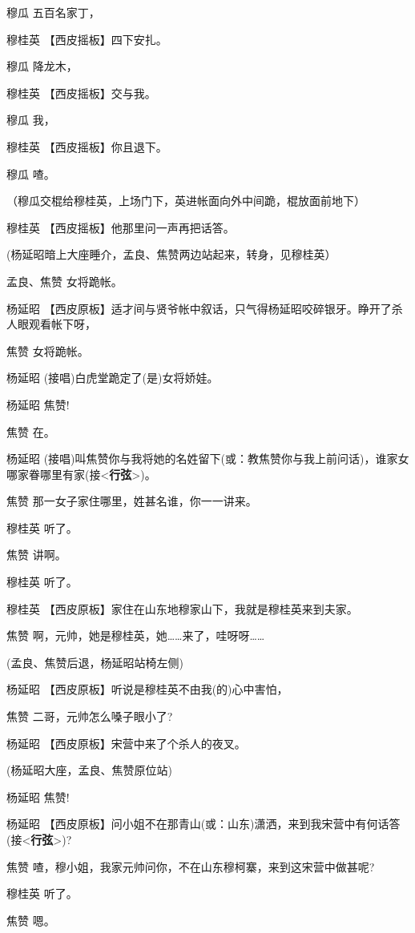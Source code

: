 穆瓜 五百名家丁，

穆桂英 【西皮摇板】四下安扎。

穆瓜 降龙木，

穆桂英 【西皮摇板】交与我。

穆瓜 我，

穆桂英 【西皮摇板】你且退下。

穆瓜 喳。

（穆瓜交棍给穆桂英，上场门下，英进帐面向外中间跪，棍放面前地下）

穆桂英 【西皮摇板】他那里问一声再把话答。

(杨延昭暗上大座睡介，孟良、焦赞两边站起来，转身，见穆桂英）

孟良、焦赞 女将跪帐。

杨延昭
【西皮原板】适才间与贤爷帐中叙话，只气得杨延昭咬碎银牙。睁开了杀人眼观看帐下呀，

焦赞 女将跪帐。

杨延昭 (接唱)白虎堂跪定了(是)女将娇娃。

杨延昭 焦赞!

焦赞 在。

杨延昭
(接唱)叫焦赞你与我将她的名姓留下(或：教焦赞你与我上前问话)，谁家女哪家眷哪里有家(接\textless{}\textbf{行弦}\textgreater{})。

焦赞 那一女子家住哪里，姓甚名谁，你一一讲来。

穆桂英 听了。

焦赞 讲啊。

穆桂英 听了。

穆桂英 【西皮原板】家住在山东地穆家山下，我就是穆桂英来到夫家。

焦赞
啊，元帅，她是穆桂英，她\ldots{}\ldots{}来了，哇呀呀\ldots{}\ldots{}

(孟良、焦赞后退，杨延昭站椅左侧)

杨延昭 【西皮原板】听说是穆桂英不由我(的)心中害怕，

焦赞 二哥，元帅怎么嗓子眼小了?

杨延昭 【西皮原板】宋营中来了个杀人的夜叉。

(杨延昭大座，孟良、焦赞原位站)

杨延昭 焦赞!

杨延昭
【西皮原板】问小姐不在那青山(或：山东)潇洒，来到我宋营中有何话答(接\textless{}\textbf{行弦}\textgreater{})?

焦赞 喳，穆小姐，我家元帅问你，不在山东穆柯寨，来到这宋营中做甚呢?

穆桂英 听了。

焦赞 嗯。

